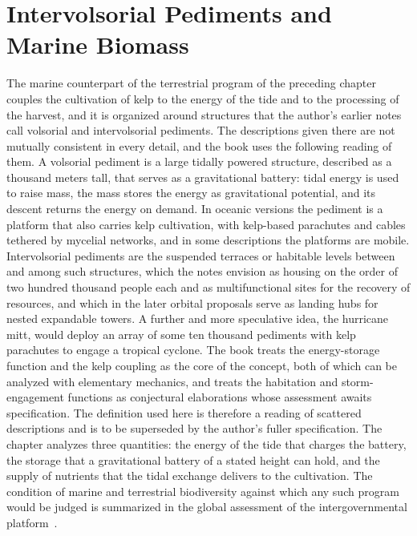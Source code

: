 \chapter{Intervolsorial Pediments and Marine Biomass}
\label{ch:20}

The marine counterpart of the terrestrial program of the preceding chapter couples the cultivation of kelp to the energy of the tide and to the processing of the harvest, and it is organized around structures that the author's earlier notes call volsorial and intervolsorial pediments. The descriptions given there are not mutually consistent in every detail, and the book uses the following reading of them. A volsorial pediment is a large tidally powered structure, described as a thousand meters tall, that serves as a gravitational battery: tidal energy is used to raise mass, the mass stores the energy as gravitational potential, and its descent returns the energy on demand. In oceanic versions the pediment is a platform that also carries kelp cultivation, with kelp-based parachutes and cables tethered by mycelial networks, and in some descriptions the platforms are mobile. Intervolsorial pediments are the suspended terraces or habitable levels between and among such structures, which the notes envision as housing on the order of two hundred thousand people each and as multifunctional sites for the recovery of resources, and which in the later orbital proposals serve as landing hubs for nested expandable towers. A further and more speculative idea, the hurricane mitt, would deploy an array of some ten thousand pediments with kelp parachutes to engage a tropical cyclone. The book treats the energy-storage function and the kelp coupling as the core of the concept, both of which can be analyzed with elementary mechanics, and treats the habitation and storm-engagement functions as conjectural elaborations whose assessment awaits specification. The definition used here is therefore a reading of scattered descriptions and is to be superseded by the author's fuller specification. The chapter analyzes three quantities: the energy of the tide that charges the battery, the storage that a gravitational battery of a stated height can hold, and the supply of nutrients that the tidal exchange delivers to the cultivation. The condition of marine and terrestrial biodiversity against which any such program would be judged is summarized in the global assessment of the intergovernmental platform~\cite{ipbes2019}.

